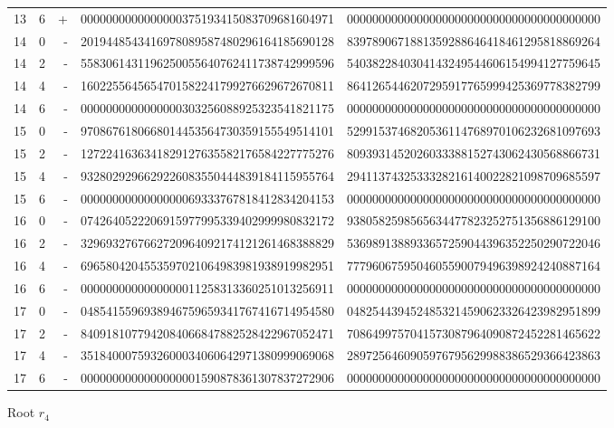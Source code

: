 \begin{longtable}{rrrll}
13 & 6 & + & 0000000000000000375193415083709681604971 & 0000000000000000000000000000000000000000 \\
14 & 0 & - & 2019448543416978089587480296164185690128 & 8397890671881359288646418461295818869264 \\
14 & 2 & - & 5583061431196250055640762411738742999596 & 5403822840304143249544606154994127759645 \\
14 & 4 & - & 1602255645654701582241799276629672670811 & 8641265446207295917765999425369778382799 \\
14 & 6 & - & 0000000000000000303256088925323541821175 & 0000000000000000000000000000000000000000 \\
15 & 0 & - & 9708676180668014453564730359155549514101 & 5299153746820536114768970106232681097693 \\
15 & 2 & - & 1272241636341829127635582176584227775276 & 8093931452026033388152743062430568866731 \\
15 & 4 & - & 9328029296629226083550444839184115955764 & 2941137432533328216140022821098709685597 \\
15 & 6 & - & 0000000000000000069333767818412834204153 & 0000000000000000000000000000000000000000 \\
16 & 0 & - & 0742640522206915977995339402999980832172 & 9380582598565634477823252751356886129100 \\
16 & 2 & - & 3296932767662720964092174121261468388829 & 5369891388933657259044396352250290722046 \\
16 & 4 & - & 6965804204553597021064983981938919982951 & 7779606759504605590079496398924240887164 \\
16 & 6 & - & 0000000000000000011258313360251013256911 & 0000000000000000000000000000000000000000 \\
17 & 0 & - & 0485415596938946759659341767416714954580 & 0482544394524853214590623326423982951899 \\
17 & 2 & - & 8409181077942084066847882528422967052471 & 7086499757041573087964090872452281465622 \\
17 & 4 & - & 3518400075932600034060642971380999069068 & 2897256460905976795629988386529366423863 \\
17 & 6 & - & 0000000000000000001590878361307837272906 & 0000000000000000000000000000000000000000 \\
\end{longtable}
\par\medskip\normalfont\normalsize Root $r_4$\par\smallskip
\fontsize{7.6}{9.2}\selectfont\ttfamily

